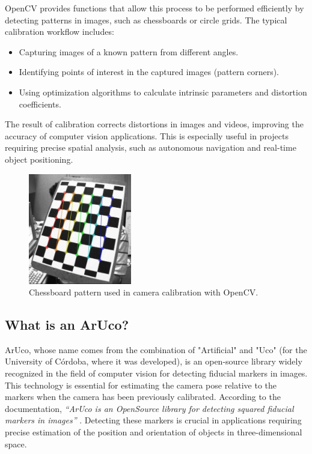     OpenCV provides functions that allow this process to be performed efficiently by detecting patterns in images, such as chessboards or circle grids. The typical calibration workflow includes:  
    
    \begin{itemize}
        \item Capturing images of a known pattern from different angles.  
        \item Identifying points of interest in the captured images (pattern corners).  
        \item Using optimization algorithms to calculate intrinsic parameters and distortion coefficients.  
    \end{itemize}  
    
    The result of calibration corrects distortions in images and videos, improving the accuracy of computer vision applications. This is especially useful in projects requiring precise spatial analysis, such as autonomous navigation and real-time object positioning.  
    
    \begin{figure}[H] 
        \centering 
        \includegraphics[width=0.4\textwidth]{pictures/calib_pattern.jpg} %
        \caption{Chessboard pattern used in camera calibration with OpenCV.} 
        \label{fig:calib_pattern} 
    \end{figure}  


\subsection{What is an ArUco?}
    ArUco, whose name comes from the combination of "Artificial" and "Uco" (for the University of Córdoba, where it was developed), is an open-source library widely recognized in the field of computer vision for detecting fiducial markers in images. This technology is essential for estimating the camera pose relative to the markers when the camera has been previously calibrated. According to the documentation, \textit{“ArUco is an OpenSource library for detecting squared fiducial markers in images”} \cite{aruco_docs}. Detecting these markers is crucial in applications requiring precise estimation of the position and orientation of objects in three-dimensional space.

